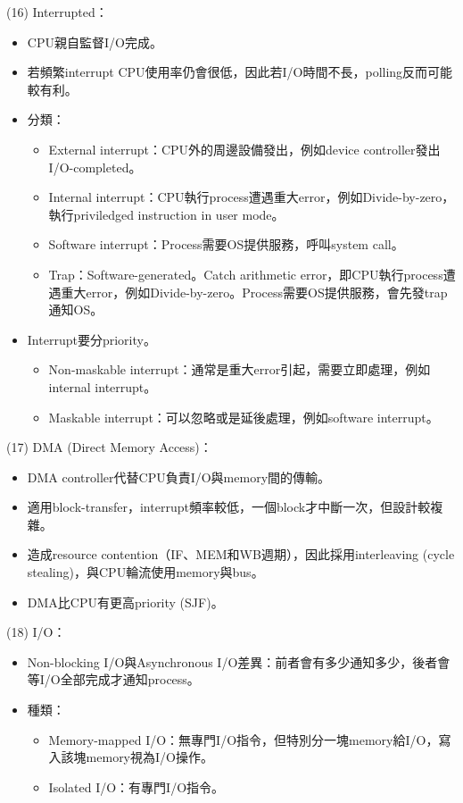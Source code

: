 \begin{theorem}{(16)} Interrupted：\begin{itemize}
        \item CPU親自監督I/O完成。
        \item 若頻繁interrupt CPU使用率仍會很低，因此若I/O時間不長，polling反而可能較有利。
        \item 分類：\begin{itemize}
            \item External interrupt：CPU外的周邊設備發出，例如device controller發出I/O-completed。
            \item Internal interrupt：CPU執行process遭遇重大error，例如Divide-by-zero，執行priviledged instruction in user mode。
            \item Software interrupt：Process需要OS提供服務，呼叫system call。
            \item Trap：Software-generated。Catch arithmetic error，即CPU執行process遭遇重大error，例如Divide-by-zero。Process需要OS提供服務，會先發trap通知OS。
        \end{itemize}
        \item Interrupt要分priority。\begin{itemize}
            \item Non-maskable interrupt：通常是重大error引起，需要立即處理，例如internal interrupt。
            \item Maskable interrupt：可以忽略或是延後處理，例如software interrupt。
        \end{itemize}
    \end{itemize}
\end{theorem}

\begin{theorem}{(17)} DMA (Direct Memory Access)：\begin{itemize}
        \item DMA controller代替CPU負責I/O與memory間的傳輸。
        \item 適用block-transfer，interrupt頻率較低，一個block才中斷一次，但設計較複雜。
        \item 造成resource contention（IF、MEM和WB週期），因此採用interleaving (cycle stealing)，與CPU輪流使用memory與bus。
        \item DMA比CPU有更高priority (SJF)。
    \end{itemize}
\end{theorem}

\begin{theorem}{(18)} I/O： \begin{itemize}
        \item Non-blocking I/O與Asynchronous I/O差異：前者會有多少通知多少，後者會等I/O全部完成才通知process。
        \item 種類：\begin{itemize}
            \item Memory-mapped I/O：無專門I/O指令，但特別分一塊memory給I/O，寫入該塊memory視為I/O操作。
            \item Isolated I/O：有專門I/O指令。
        \end{itemize}
    \end{itemize}
\end{theorem}
